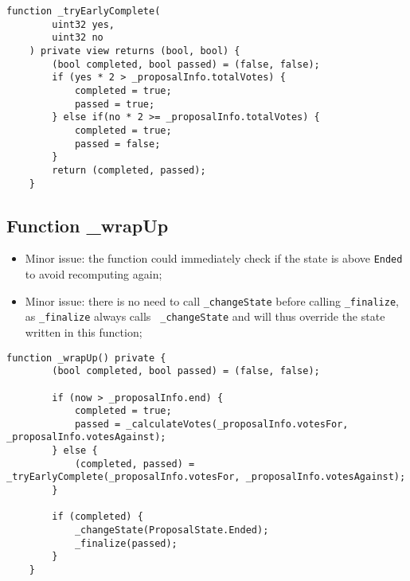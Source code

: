 \begin{lstlisting}[firstnumber=101]
    function _tryEarlyComplete(
        uint32 yes,
        uint32 no
    ) private view returns (bool, bool) {
        (bool completed, bool passed) = (false, false);
        if (yes * 2 > _proposalInfo.totalVotes) {
            completed = true;
            passed = true;
        } else if(no * 2 >= _proposalInfo.totalVotes) {
            completed = true;
            passed = false;
        }
        return (completed, passed);
    }
\end{lstlisting}

\subsection{Function \_{}wrapUp}

\begin{itemize}
\item Minor issue: the function could immediately check if the state
  is above {\tt Ended} to avoid recomputing again;
\item Minor issue: there is no need to call {\tt \_changeState} before
  calling {\tt \_finalize}, as {\tt \_finalize} always calls {\tt
    \_changeState} and will thus override the state written in this
  function;
\end{itemize}

\begin{lstlisting}[firstnumber=116]
    function _wrapUp() private {
        (bool completed, bool passed) = (false, false);

        if (now > _proposalInfo.end) {
            completed = true;
            passed = _calculateVotes(_proposalInfo.votesFor, _proposalInfo.votesAgainst);
        } else {
            (completed, passed) = _tryEarlyComplete(_proposalInfo.votesFor, _proposalInfo.votesAgainst);
        }

        if (completed) {
            _changeState(ProposalState.Ended);
            _finalize(passed);
        }
    }
\end{lstlisting}
